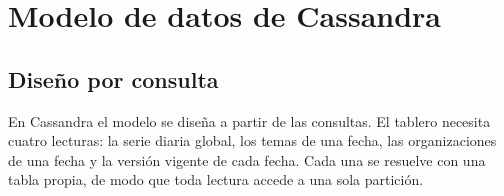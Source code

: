 \documentclass[11pt,a4paper]{article}
\begin{document}
\section{Modelo de datos de Cassandra}\label{sec:cassandra}

\subsection{Diseño por consulta}

En Cassandra el modelo se diseña a partir de las consultas. El tablero necesita cuatro lecturas: la serie diaria global, los temas de una fecha, las organizaciones de una fecha y la versión vigente de cada fecha. Cada una se resuelve con una tabla propia, de modo que toda lectura accede a una sola partición.
\end{document}

